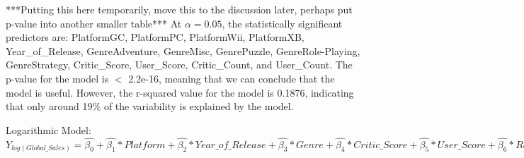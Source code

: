 \documentclass[12pt]{article}
\begin{document}
\begin{table}[ht]
\end{table}

 ***Putting this here temporarily, move this to the discussion later, perhaps put p-value into another smaller table***
At $\alpha=0.05$, the statistically significant predictors are: PlatformGC, PlatformPC, PlatformWii, PlatformXB, Year_of_Release, 
GenreAdventure, GenreMisc, GenrePuzzle, GenreRole-Playing, GenreStrategy, Critic_Score, User_Score, Critic_Count, and User_Count. 
The p-value for the model is $<$ 2.2e-16, meaning that we can conclude that the model is useful. However, the r-squared value for the model is 0.1876,
indicating that only around 19\% of the variability is explained by the model.

Logarithmic Model:
$Y_{log(Global\_Sales)}=\hat{\beta_{0}}+\hat{\beta_{1}}*Platform+\hat{\beta_{2}}*Year\_of\_Release+\hat{\beta_{3}}*Genre+\hat{\beta_{4}}*Critic\_Score+\hat{\beta_{5}}*User\_Score+\hat{\beta_{6}}*Rating+\hat{\beta_{7}}*Critic\_Count+\hat{\beta_{8}}*Critic\_Count$
\end{document}
